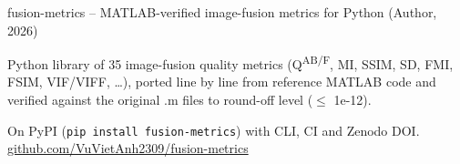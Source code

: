 
\begin{cventries}

  \cventry
    {fusion-metrics -- MATLAB-verified image-fusion metrics for Python (Author, 2026)}
    {}
    {
      \begin{cvitems}
        \item {Python library of 35 image-fusion quality metrics (Q\textsuperscript{AB/F}, MI, SSIM, SD, FMI, FSIM, VIF/VIFF, \ldots), ported line by line from reference MATLAB code and verified against the original .m files to round-off level ($\leq$ 1e-12).}
        \item {On PyPI (\texttt{pip install fusion-metrics}) with CLI, CI and Zenodo DOI. \href{https://github.com/VuVietAnh2309/fusion-metrics}{github.com/VuVietAnh2309/fusion-metrics}}
      \end{cvitems}
    }

\end{cventries}
